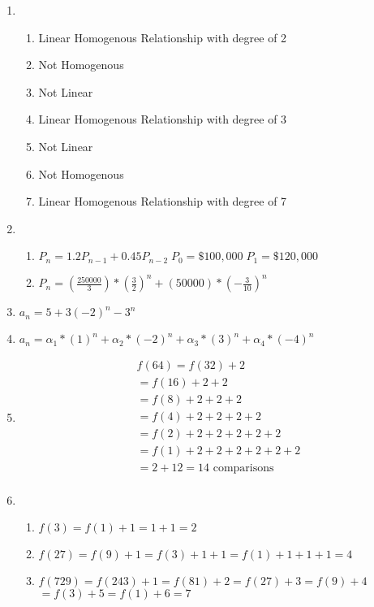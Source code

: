 \documentclass[11pt]{article}
\begin{document}
\begin{enumerate}
    \newpage
    \item \begin{enumerate}
        \item Linear Homogenous Relationship with degree of 2
        \item Not Homogenous
        \item Not Linear
        \item Linear Homogenous Relationship with degree of 3
        \item Not Linear
        \item Not Homogenous
        \item Linear Homogenous Relationship with degree of 7
    \end{enumerate}
    \item \begin{enumerate}
        \item $P_n = 1.2P_{n-1} + 0.45P_{n-2} \; P_0 = \$100,000 \; P_1 = \$120,000$
        \item $P_n = (\frac{250000}{3})*(\frac{3}{2})^n + (50000)*(-\frac{3}{10})^n$
    \end{enumerate}
    \item $ a_n = 5 + 3(-2)^n - 3^n $
    \item $ a_n = \alpha_1 * (1)^n + \alpha_2 * (-2)^n + \alpha_3 * (3)^n + \alpha_4 * (-4)^n $ 
    \item \begin{align*}
        & f(64) = f(32) + 2 \\
        & = f(16) + 2 + 2 \\
        & = f(8) + 2 + 2 + 2 \\
        & = f(4) + 2 + 2 + 2 + 2 \\
        & = f(2) + 2 + 2 + 2 + 2 + 2 \\
        & = f(1) + 2 + 2 + 2 + 2 + 2 + 2 \\
        & = 2 + 12 = 14 \text{ comparisons}\\
    \end{align*}
    \item \begin{enumerate}
        \item $f(3) = f(1) + 1 = 1+1 = 2$
        \item $f(27) = f(9) + 1 = f(3) + 1 + 1 = f(1) + 1 + 1 + 1 = 4$
        \item $f(729) = f(243) + 1 = f(81) + 2 = f(27) + 3 = f(9) + 4$\newline
        $=f(3) + 5 = f(1) + 6 = 7 $
    \end{enumerate}

\end{enumerate}
\end{document}
